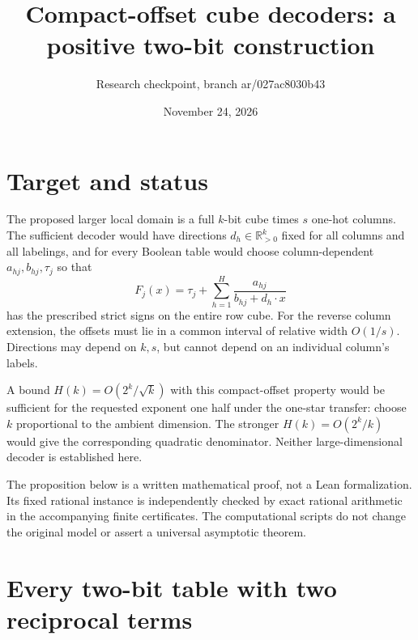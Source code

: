\documentclass[11pt]{article}
\title{Compact-offset cube decoders: a positive two-bit construction}
\author{Research checkpoint, branch ar/027ac8030b43}
\date{November 24, 2026}
\begin{document}
\maketitle

\section{Target and status}

The proposed larger local domain is a full $k$-bit cube times $s$ one-hot
columns. The sufficient decoder would have directions
$d_h\in\mathbb R_{>0}^k$ fixed for all columns and all labelings, and for
every Boolean table would choose column-dependent $a_{hj},b_{hj},\tau_j$
so that
\[
 F_j(x)=\tau_j+\sum_{h=1}^H\frac{a_{hj}}{b_{hj}+d_h\cdot x}
\]
has the prescribed strict signs on the entire row cube. For the reverse
column extension, the offsets must lie in a common interval of relative
width $O(1/s)$. Directions may depend on $k,s$, but cannot depend on an
individual column's labels.

A bound $H(k)=O(2^k/\sqrt{k})$ with this compact-offset property would be
sufficient for the requested exponent one half under the one-star
transfer: choose $k$ proportional to the ambient dimension. The stronger
$H(k)=O(2^k/k)$ would give the corresponding quadratic denominator. Neither
large-dimensional decoder is established here.

The proposition below is a written mathematical proof, not a Lean
formalization. Its fixed rational instance is independently checked by
exact rational arithmetic in the accompanying finite certificates. The
computational scripts do not change the original model or assert a
universal asymptotic theorem.

\section{Every two-bit table with two reciprocal terms}
\end{document}
